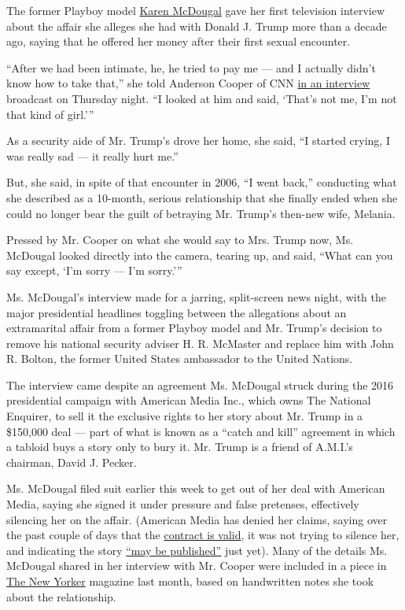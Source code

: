 The former Playboy model
\href{https://www.nytimes3xbfgragh.onion/2019/12/05/us/fox-news-mcdougal.html}{Karen
McDougal} gave her first television interview about the affair she
alleges she had with Donald J. Trump more than a decade ago, saying that
he offered her money after their first sexual encounter.

``After we had been intimate, he, he tried to pay me --- and I actually
didn't know how to take that,'' she told Anderson Cooper of CNN
\href{https://www.cnn.com/2018/03/22/politics/karen-mcdougal-donald-trump/index.html}{in
an interview} broadcast on Thursday night. ``I looked at him and said,
`That's not me, I'm not that kind of girl.'''

As a security aide of Mr. Trump's drove her home, she said, ``I started
crying, I was really sad --- it really hurt me.''

But, she said, in spite of that encounter in 2006, ``I went back,''
conducting what she described as a 10-month, serious relationship that
she finally ended when she could no longer bear the guilt of betraying
Mr. Trump's then-new wife, Melania.

Pressed by Mr. Cooper on what she would say to Mrs. Trump now, Ms.
McDougal looked directly into the camera, tearing up, and said, ``What
can you say except, `I'm sorry --- I'm sorry.'''

Ms. McDougal's interview made for a jarring, split-screen news night,
with the major presidential headlines toggling between the allegations
about an extramarital affair from a former Playboy model and Mr. Trump's
decision to remove his national security adviser H. R. McMaster and
replace him with John R. Bolton, the former United States ambassador to
the United Nations.

The interview came despite an agreement Ms. McDougal struck during the
2016 presidential campaign with American Media Inc., which owns The
National Enquirer, to sell it the exclusive rights to her story about
Mr. Trump in a \$150,000 deal --- part of what is known as a ``catch and
kill'' agreement in which a tabloid buys a story only to bury it. Mr.
Trump is a friend of A.M.I.'s chairman, David J. Pecker.

Ms. McDougal filed suit earlier this week to get out of her deal with
American Media, saying she signed it under pressure and false pretenses,
effectively silencing her on the affair. (American Media has denied her
claims, saying over the past couple of days that the
\href{https://www.prnewswire.com/news-releases/american-media-inc-statement-in-response-to-complaint-filed-by-karen-mcdougal-300617127.html}{contract
is valid}, it was not trying to silence her, and indicating the story
\href{https://www.prnewswire.com/news-releases/american-media-inc-responds-to-comments-made-by-attorney-peter-stris-300617875.html}{``may
be published''} just yet). Many of the details Ms. McDougal shared in
her interview with Mr. Cooper were included in a piece in
\href{https://www.newyorker.com/news/news-desk/donald-trump-a-playboy-model-and-a-system-for-concealing-infidelity-national-enquirer-karen-mcdougal}{The
New Yorker} magazine last month, based on handwritten notes she took
about the relationship.

